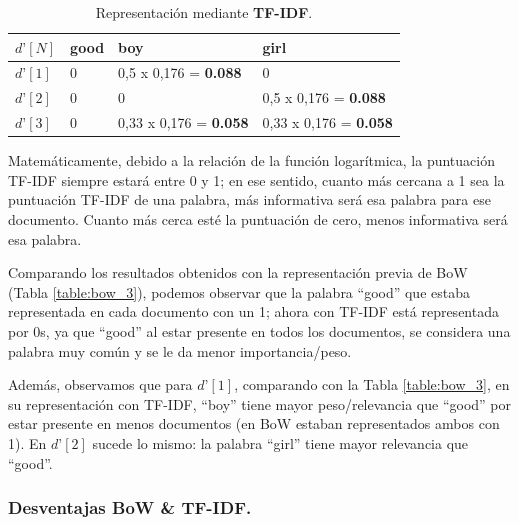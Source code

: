 \documentclass[12pt,a4paper]{article}
\begin{document}
\begin{sloppypar}
\begin{table}[h!]
\centering
\begin{tabular}{|p{1cm}||p{1cm}|p{4cm}|p{4cm}|}
\hline
\centering $d’[N]$ & \textbf{good} & \textbf{boy} & \textbf{girl}  \\ [1ex] 
\hline
$d’[1]$ & 0 & 0,5 x 0,176 = \textbf{0.088} & 0  \\
\hline
$d’[2]$ & 0 & 0 & 0,5 x 0,176 = \textbf{0.088}  \\
\hline
$d’[3]$ & 0 & 0,33 x 0,176 = \textbf{0.058} & 0,33 x 0,176 = \textbf{0.058}  \\
\hline
\end{tabular}
\caption{Representación mediante \textbf{TF-IDF}\cite{NLP_2}.} 
\label{table:tf_idf_3}
\end{table}

Matemáticamente, debido a la relación de la función logarítmica, la puntuación TF-IDF siempre estará entre 0 y 1; en ese sentido, cuanto más cercana a 1 sea la puntuación TF-IDF de una palabra, más informativa será esa palabra para ese documento. Cuanto más cerca esté la puntuación de cero, menos informativa será esa palabra\cite{NLP_7}.

Comparando los resultados obtenidos con la representación previa de BoW (Tabla \ref{table:bow_3}), podemos observar que la palabra “good” que estaba representada en cada documento con un 1; ahora con TF-IDF está representada por 0s, ya que “good” al estar presente en todos los documentos, se considera una palabra muy común y se le da menor importancia/peso.

Además, observamos que para $d’[1]$, comparando con la Tabla \ref{table:bow_3}, en su representación con TF-IDF, “boy” tiene mayor peso/relevancia que “good” por estar presente en menos documentos (en BoW estaban representados ambos con 1). En $d’[2]$ sucede lo mismo: la palabra “girl” tiene mayor relevancia que “good”.

\subsubsection{Desventajas BoW \& TF-IDF.}\label{desv_bow_tfidf}


\end{sloppypar}
\end{document}
